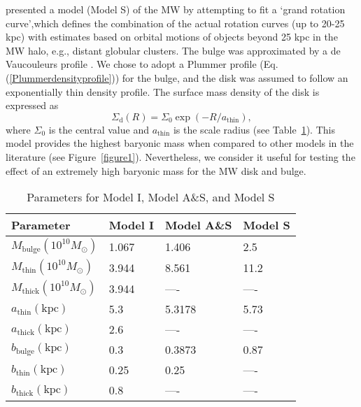 \documentclass{aa}
\begin{document}
\citet{Sofue2015} presented a model (Model S) of the MW by attempting to fit a `grand rotation curve',which defines the combination of the actual rotation curves (up to 20-25 kpc) with estimates based on orbital motions of objects beyond 25 kpc in the MW halo, e.g., distant globular clusters. The bulge was approximated by a de Vaucouleurs profile \citep{deVaucouleurs1958}. We chose to adopt a Plummer profile (Eq. (\ref{Plummerdensityprofile})) for the bulge, and the disk was assumed to follow an exponentially thin density profile. The surface mass density of the disk is expressed as \citep{Sofue2015}
\begin{equation}
    \Sigma_\mathrm{d}(R)=\Sigma_0\exp{(-R/a_\mathrm{thin})}
    \label{sofuedisk}
,\end{equation}
where $\Sigma_0$ is the central value and $a_\mathrm{thin}$ is the scale radius (see Table~\ref{table1}). This model provides the highest baryonic mass when compared to other models in the literature (see Figure~\ref{figure1}). Nevertheless, we consider it useful for testing the effect of an extremely high baryonic mass for the MW disk and bulge. 

\begin{table}
    \centering
    \caption{Parameters for Model I, Model A\&S, and Model S}
    \begin{tabular}{l l l l }
         \hline\hline
    Parameter & Model I  & Model A\&S & Model S \\
    \hline
    $M_{\mathrm{bulge}} (10^{10} M_{\odot})$ & 1.067 & 1.406 & 2.5 \\
    $M_{\mathrm{thin}} (10^{10} M_{\odot})$ & 3.944 & 8.561 & 11.2 \\
    $M_{\mathrm{thick}} (10^{10} M_{\odot})$ & 3.944 & ---- & ---- \\
    $a_{\mathrm{thin}} (\mathrm{kpc})$ & 5.3 & 5.3178 & 5.73\\
    $a_{\mathrm{thick}} (\mathrm{kpc})$ & 2.6 & ---- & ---- \\
    $b_{\mathrm{bulge}} (\mathrm{kpc})$ & 0.3 & 0.3873 & 0.87\\
    $b_{\mathrm{thin}} (\mathrm{kpc})$ & 0.25 & 0.25 & ---- \\
    $b_{\mathrm{thick}} (\mathrm{kpc})$ & 0.8  &---- &  ----\\
    \hline 
    \end{tabular}
    \label{table1}
\end{table}
\end{document}
